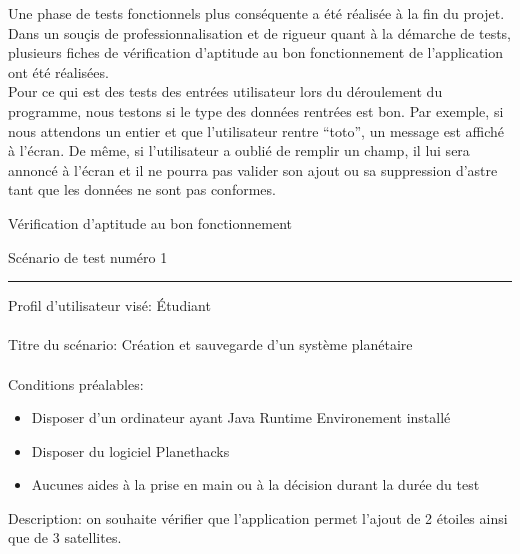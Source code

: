 \documentclass[a4paper,10pt]{article}
\begin{document}
Une phase de tests fonctionnels plus conséquente a été réalisée à la fin du projet. Dans un souçis de professionnalisation et de rigueur quant à
la démarche de tests, plusieurs fiches de vérification d'aptitude au bon fonctionnement de l'application ont été réalisées.
\\

Pour ce qui est des tests des entrées utilisateur lors du déroulement du programme, nous testons si le type des données rentrées est bon. Par exemple, si nous attendons un entier et que l'utilisateur rentre ``toto'', un message est affiché à l'écran. De même, si l'utilisateur a oublié de remplir un champ, il lui sera annoncé à l'écran et il ne pourra pas valider son ajout ou sa suppression d'astre tant que les données ne sont pas conformes.

\newpage
{}
\begin{center}
  \begin{huge}
    Vérification d'aptitude au bon fonctionnement \\
  \end{huge}
  \vspace{1cm}
  \begin{Large}
    Scénario de test numéro 1
  \end{Large}
\end{center}
\rule{\linewidth}{.5pt}
Profil d'utilisateur visé: Étudiant \\\\
Titre du scénario: Création et sauvegarde d'un système planétaire \\\\
Conditions préalables:
\begin{itemize}
 \item Disposer d'un ordinateur ayant Java Runtime Environement installé
 \item Disposer du logiciel Planethacks
 \item Aucunes aides à la prise en main ou à la décision durant la durée du test
\end{itemize}
Description: on souhaite vérifier que l'application permet l'ajout de 2 étoiles ainsi que de 3 satellites. 
\end{document}
